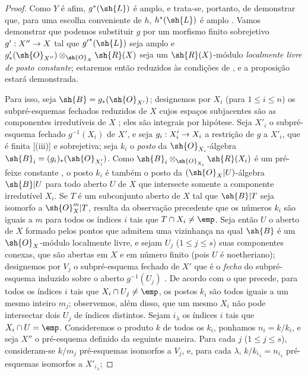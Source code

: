 \documentclass[oneside,10pt]{amsart}
\makeatletter
\renewcommand{\leq}{\leqslant}
\newcommand{\ega@arrow}[2]{\mathchoice{#1}{#2}{#2}{#2}}
\renewcommand{\to}{\ega@arrow{\longrightarrow}{\rightarrow}}
\newcommand{\oldpage}[2][]{\marginnote{\normalfont\footnotesize\textbf{#1}~|~#2}\ignorespaces}
\makeatother
\begin{document}
\begin{proof}
Como $Y$ é afim, $g^*(\sh{L})$ é amplo, e trata-se, portanto, de demonstrar que, para uma escolha conveniente de $h$, $h^*(\sh{L})$ é amplo .
Vamos demonstrar que podemos substituir $g$ por um morfismo finito sobrejetivo $g':X''\to X$ tal que ${g'}^*(\sh{L})$ seja amplo e $g'_*(\sh{O}_{X''})\otimes_{\sh{O}_X}\sh{R}(X)$ seja um $\sh{R}(X)$-módulo \emph{localmente livre de posto constante};
estaremos então reduzidos às condições de , e a proposição estará demonstrada.

Para isso, seja $\sh{B}=g_*(\sh{O}_{X'})$;
designemos por $X_i$ (para $1\leq i\leq n$) os subpré-esquemas fechados reduzidos de $X$ cujos espaços subjacentes são as componentes irredutíveis de $X$ ;
eles são integrais por hipótese.
Seja $X'_i$ o subpré-esquema fechado
\oldpage[II]{135}
$g^{-1}(X_i)$ de $X'$, e seja $g_i:X'_i\to X_i$ a restrição de $g$ a $X'_i$, que é finita [(iii)] e sobrejetiva;
seja $k_i$ o \emph{posto} da $\sh{O}_{X_i}$-álgebra $\sh{B}_i=(g_i)_*(\sh{O}_{X'_i})$.
Como $\sh{B}_i\otimes_{\sh{O}_{X_i}}\sh{R}(X_i)$ é um pré-feixe constante , o posto $k_i$ é também o posto da $(\sh{O}_X|U)$-álgebra $\sh{B}|U$ para todo aberto $U$ de $X$ que intersecte somente a componente irredutível $X_i$.
Se $T$ é um subconjunto aberto de $X$ tal que $\sh{B}|T$ seja isomorfo a $\sh{O}_X^m|T$, resulta da observação precedente que os números $k_i$ são iguais a $m$ para todos os índices $i$ tais que $T\cap X_i\neq\emp$.
Seja então $U$ o aberto de $X$ formado pelos pontos que admitem uma vizinhança na qual $\sh{B}$ é um $\sh{O}_X$-módulo localmente livre, e sejam $U_j$ ($1\leq j\leq s$) suas componentes conexas, que são abertas em $X$ e em número finito (pois $U$ é noetheriano);
designemos por $V_j$ o subpré-esquema fechado de $X'$ que é o \emph{fecho} do subpré-esquema induzido sobre o aberto $g^{-1}(U_j)$ .
De acordo com o que precede, para todos os índices $i$ tais que $X_i\cap U_j\neq\emp$, os postos $k_i$ são todos iguais a um mesmo inteiro $m_j$;
observemos, além disso, que um mesmo $X_i$ não pode intersectar dois $U_j$ de índices distintos.
Sejam $i_\lambda$ os índices $i$ tais que $X_i\cap U=\emp$.
Consideremos o produto $k$ de todos os $k_i$, ponhamos $n_i=k/k_i$, e seja $X''$ o pré-esquema definido da seguinte maneira.
Para cada $j$ ($1\leq j\leq s$), consideram-se $k/m_j$ pré-esquemas isomorfos a $V_j$, e, para cada $\lambda$, $k/k_{i_\lambda}=n_{i_\lambda}$ pré-esquemas isomorfos a $X'_{i_\lambda}$;

\end{proof}
\end{document}
